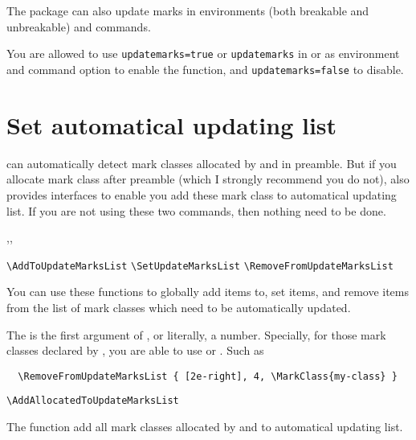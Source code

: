 \documentclass{l3doc}
\begin{document}
\section{}

The  package can also update marks in  environments
(both breakable and unbreakable) and  commands.

You are allowed to use \verb|updatemarks=true| or \verb|updatemarks| in 
or as environment and command option to enable the function, and 
\verb|updatemarks=false| to disable.


\section{Set automatical updating list}

 can automatically detect mark classes allocated by 
and  in preamble. But if you allocate mark class after preamble
(which I strongly recommend you do not),
 also provides interfaces to enable you add these mark class to 
automatical updating list. If you are not using these two commands, then nothing need 
to be done.


\enlargethispage{20pt}

\begin{function}{\AddToUpdateMarksList,\SetUpdateMarksList,\RemoveFromUpdateMarksList}
  \begin{syntax}
    \verb|\AddToUpdateMarksList|      
    \verb|\SetUpdateMarksList|        
    \verb|\RemoveFromUpdateMarksList| 
  \end{syntax}
You can use these functions to globally add items to, set items, and remove items from 
the list of mark classes which need to be automatically updated.

The  is the first argument of , or literally, a number.
Specially, for those mark classes declared by , you are able to use 
 or . Such as 
\begin{verbatim}
  \RemoveFromUpdateMarksList { [2e-right], 4, \MarkClass{my-class} }
\end{verbatim}
\end{function}


\begin{function}{\AddAllocatedToUpdateMarksList}
  \begin{syntax}
    \verb|\AddAllocatedToUpdateMarksList|
  \end{syntax}
The function add all mark classes allocated by  and 
to automatical updating list.
\end{function}
\end{document}
